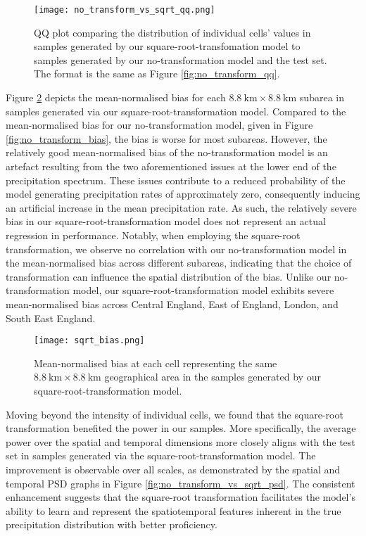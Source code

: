 \documentclass[ oneside,%
                    author={George Herbert},
                    degree={MSci},
                     title={Diffusion Models for Time-Evolving Precipitation Fields},
                  subtitle={}]{dissertation}
\begin{document}
\begin{figure}[htbp]
      \centering
      \texttt{[image: no\_transform\_vs\_sqrt\_qq.png]}
      \caption{QQ plot comparing the distribution of individual cells' values in samples generated by our square-root-transfomation model to samples generated by our no-transformation model and the test set. The format is the same as Figure \ref{fig:no_transform_qq}.}
      \label{fig:no_transform_vs_sqrt_qq}
\end{figure}

Figure \ref{fig:sqrt_bias} depicts the mean-normalised bias for each $8.8\ \mathrm{km}\times 8.8\ \mathrm{km}$ subarea in samples generated via our square-root-transformation model. Compared to the mean-normalised bias for our no-transformation model, given in Figure \ref{fig:no_transform_bias}, the bias is worse for most subareas. However, the relatively good mean-normalised bias of the no-transformation model is an artefact resulting from the two aforementioned issues at the lower end of the precipitation spectrum. These issues contribute to a reduced probability of the model generating precipitation rates of approximately zero, consequently inducing an artificial increase in the mean precipitation rate. As such, the relatively severe bias in our square-root-transformation model does not represent an actual regression in performance. Notably, when employing the square-root transformation, we observe no correlation with our no-transformation model in the mean-normalised bias across different subareas, indicating that the choice of transformation can influence the spatial distribution of the bias. Unlike our no-transformation model, our square-root-transformation model exhibits severe mean-normalised bias across Central England, East of England, London, and South East England.

\begin{figure}[htbp]
      \centering
      \texttt{[image: sqrt\_bias.png]}
      \caption{Mean-normalised bias at each cell representing the same $8.8\ \mathrm{km}\times 8.8\ \mathrm{km}$ geographical area in the samples generated by our square-root-transformation model.}
      \label{fig:sqrt_bias}
\end{figure}

Moving beyond the intensity of individual cells, we found that the square-root transformation benefited the power in our samples. More specifically, the average power over the spatial and temporal dimensions more closely aligns with the test set in samples generated via the square-root-transformation model. The improvement is observable over all scales, as demonstrated by the spatial and temporal PSD graphs in Figure \ref{fig:no_transform_vs_sqrt_psd}. The consistent enhancement suggests that the square-root transformation facilitates the model's ability to learn and represent the spatiotemporal features inherent in the true precipitation distribution with better proficiency.
\end{document}
